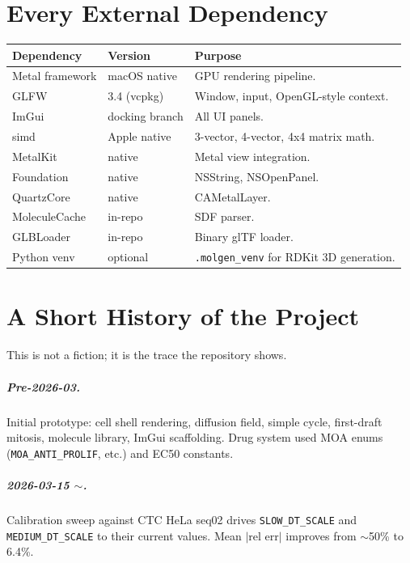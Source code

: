 \documentclass[11pt,letterpaper,twoside,openany]{book}
\newcommand{\code}[1]{\texttt{#1}}
\begin{document}
\chapter{Every External Dependency}
\label{ch:deps}

\begin{longtable}{p{3.5cm}p{2.5cm}p{7.5cm}}
\toprule
\textbf{Dependency} & \textbf{Version} & \textbf{Purpose}\\ \midrule
Metal framework & macOS native & GPU rendering pipeline.\\
GLFW           & 3.4 (vcpkg)   & Window, input, OpenGL-style context.\\
ImGui          & docking branch & All UI panels.\\
simd           & Apple native  & 3-vector, 4-vector, 4x4 matrix math.\\
MetalKit       & native        & Metal view integration.\\
Foundation     & native        & NSString, NSOpenPanel.\\
QuartzCore     & native        & CAMetalLayer.\\
MoleculeCache  & in-repo       & SDF parser.\\
GLBLoader      & in-repo       & Binary glTF loader.\\
Python venv    & optional      & \code{.molgen\_venv} for RDKit 3D generation.\\
\bottomrule
\end{longtable}

\chapter{A Short History of the Project}
\label{ch:history}

This is not a fiction; it is the trace the repository shows.

\paragraph{Pre-2026-03.} Initial prototype: cell shell rendering,
diffusion field, simple cycle, first-draft mitosis, molecule
library, ImGui scaffolding. Drug system used MOA enums
(\code{MOA\_ANTI\_PROLIF}, etc.) and EC50 constants.

\paragraph{2026-03-15 $\sim$.} Calibration sweep against
CTC HeLa seq02 drives \code{SLOW\_DT\_SCALE} and
\code{MEDIUM\_DT\_SCALE} to their current values. Mean
$|$rel err$|$ improves from $\sim$50\% to 6.4\%.
\end{document}
